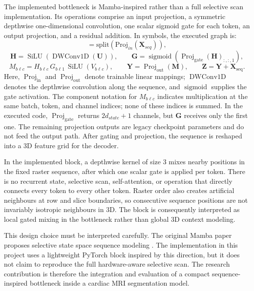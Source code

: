 The implemented bottleneck is Mamba-inspired rather than a full selective scan implementation. Its operations comprise an input projection, a symmetric depthwise one-dimensional convolution, one scalar sigmoid gate for each token, an output projection, and a residual addition. In symbols, the executed graph is:
\begin{equation}
    [\mathbf{U},\mathbf{V}] = \mathrm{split}\!\left(\mathrm{Proj}_{in}(\mathbf{X}_{seq})\right),
\end{equation}
\begin{equation}
    \mathbf{H}=\operatorname{SiLU}\!\left(\operatorname{DWConv1D}(\mathbf{U})\right),
    \qquad
    \mathbf{G}=\operatorname{sigmoid}\!\left(\operatorname{Proj}_{\mathrm{gate}}(\mathbf{H})_{:,:,1}\right),
\end{equation}
\begin{equation}
    M_{b\ell c}=H_{b\ell c}\,G_{b\ell 1}\,
      \operatorname{SiLU}(V_{b\ell c}),
    \qquad
    \mathbf{Y}=\operatorname{Proj}_{\mathrm{out}}(\mathbf{M}),
    \qquad
    \mathbf{Z}=\mathbf{Y}+\mathbf{X}_{\mathrm{seq}}.
\end{equation}
Here, \(\operatorname{Proj}_{\mathrm{in}}\) and
\(\operatorname{Proj}_{\mathrm{out}}\) denote trainable linear mappings;
\(\operatorname{DWConv1D}\) denotes the depthwise convolution along the
sequence, and \(\operatorname{sigmoid}\) supplies the gate activation. The
component notation for \(M_{b\ell c}\) indicates multiplication at the same
batch, token, and channel indices; none of these indices is summed. In the
executed code, \(\operatorname{Proj}_{\mathrm{gate}}\) returns
$2d_{state}+1$ channels, but \(\mathbf{G}\) receives only the first one. The
remaining projection outputs are legacy checkpoint parameters and do not feed
the output path. After gating and projection, the sequence is reshaped into a
3D feature grid for the decoder.

In the implemented block, a depthwise kernel of size 3 mixes nearby positions in the fixed raster sequence, after which one scalar gate is applied per token. There is no recurrent state, selective scan, self-attention, or operation that directly connects every token to every other token. Raster order also creates artificial neighbours at row and slice boundaries, so consecutive sequence positions are not invariably isotropic neighbours in 3D. The block is consequently interpreted as local gated mixing in the bottleneck rather than global 3D context modeling.

This design choice must be interpreted carefully. The original Mamba paper proposes selective state space sequence modeling \citep{gu2023mamba}. The implementation in this project uses a lightweight PyTorch block inspired by this direction, but it does not claim to reproduce the full hardware-aware selective scan. The research contribution is therefore the integration and evaluation of a compact sequence-inspired bottleneck inside a cardiac MRI segmentation model.

